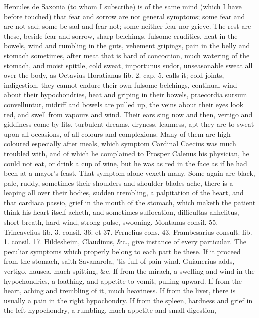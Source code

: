 {Hercules de Saxonia (to whom I subscribe) is of the same mind
(which I have before touched) that fear and sorrow are not general
symptoms; some fear and are not sad; some be sad and fear not; some
neither fear nor grieve. The rest are these, beside fear and sorrow,
sharp belchings, fulsome crudities, heat in the bowels, wind and
rumbling in the guts, vehement gripings, pain in the belly and stomach
sometimes, after meat that is hard of concoction, much watering of the
stomach, and moist spittle, cold sweat, importunus sudor, unseasonable
sweat all over the body, as Octavius Horatianus lib. 2. cap. 5. calls
it; cold joints, indigestion, they cannot endure their own
fulsome belchings, continual wind about their hypochondries, heat and
griping in their bowels, praecordia sursum convelluntur, midriff and
bowels are pulled up, the veins about their eyes look red, and swell
from vapours and wind. Their ears sing now and then, vertigo and
giddiness come by fits, turbulent dreams, dryness, leanness, apt they
are to sweat upon all occasions, of all colours and complexions. Many
of them are high-coloured especially after meals, which symptom
Cardinal Caecius was much troubled with, and of which he complained to
Prosper Calenus his physician, he could not eat, or drink a cup of
wine, but he was as red in the face as if he had been at a mayor's
feast. That symptom alone vexeth many. Some again are black,
pale, ruddy, sometimes their shoulders and shoulder blades ache, there
is a leaping all over their bodies, sudden trembling, a palpitation of
the heart, and that cardiaca passio, grief in the mouth of the stomach,
which maketh the patient think his heart itself acheth, and sometimes
suffocation, difficultas anhelitus, short breath, hard wind, strong
pulse, swooning. Montanus consil. 55. Trincavelius lib. 3. consil. 36.
et 37. Fernelius cons. 43. Frambesarius consult. lib. 1. consil. 17.
Hildesheim, Claudinus, \&c., give instance of every particular. The
peculiar symptoms which properly belong to each part be these. If it
proceed from the stomach, saith Savanarola, 'tis full of pain
wind. Guianerius adds, vertigo, nausea, much spitting, \&c. If from the
mirach, a swelling and wind in the hypochondries, a loathing, and
appetite to vomit, pulling upward. If from the heart, aching and
trembling of it, much heaviness. If from the liver, there is usually a
pain in the right hypochondry. If from the spleen, hardness and grief
in the left hypochondry, a rumbling, much appetite and small digestion,
}
